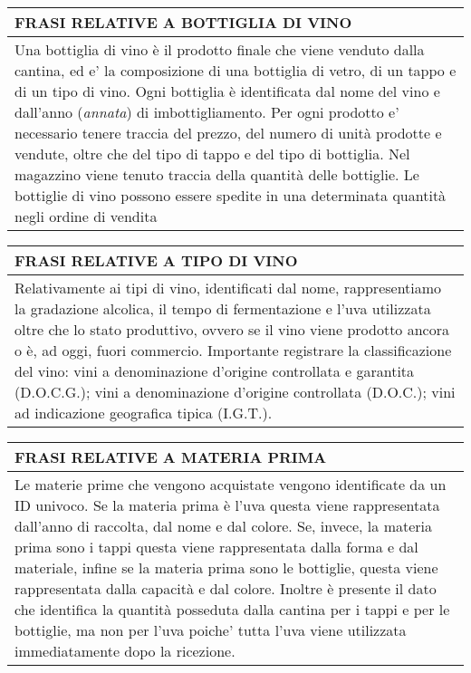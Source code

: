 \begin{center}
	\begin{tabular}{P{16cm}}
		\toprule
		 \textbf {\large {FRASI RELATIVE A BOTTIGLIA DI VINO}} \\
		\midrule
		Una bottiglia di vino è il prodotto finale che viene venduto dalla cantina, ed e' la composizione di una bottiglia di vetro, di un tappo e di un tipo di vino. Ogni bottiglia è identificata dal nome del vino e dall'anno (\emph{annata}) di imbottigliamento. Per ogni prodotto e' necessario tenere traccia del prezzo, del numero di unità prodotte e vendute, oltre che del tipo di tappo e del tipo di bottiglia. Nel magazzino viene tenuto traccia della quantità delle bottiglie. Le bottiglie di vino possono essere spedite in una determinata quantità negli ordine di vendita\\
		\bottomrule
	\end{tabular}

	\vspace{0.5cm}
	
	\begin{tabular}{P{16cm}}
		\toprule
		 \textbf {\large {FRASI RELATIVE A TIPO DI VINO}} \\
		\midrule
		Relativamente ai tipi di vino, identificati dal nome, rappresentiamo la gradazione alcolica, il tempo di fermentazione e l'uva utilizzata oltre che lo stato produttivo, ovvero se il vino viene prodotto ancora o è, ad oggi, fuori commercio. Importante registrare la classificazione del vino: vini a denominazione d'origine controllata e garantita (D.O.C.G.); vini a denominazione d'origine controllata (D.O.C.); vini ad indicazione geografica tipica (I.G.T.). \\
		\bottomrule
	\end{tabular}

	\vspace{0.5cm}
	
	\begin{tabular}{P{16cm}}
		\toprule
		 \textbf {\large {FRASI RELATIVE A MATERIA PRIMA}} \\
		\midrule
		Le materie prime che vengono acquistate vengono identificate da un ID univoco. Se la materia prima è l'uva questa viene rappresentata dall'anno di raccolta, dal nome e dal colore. Se, invece, la materia prima sono i tappi questa viene rappresentata dalla forma e dal materiale, infine se la materia prima sono le bottiglie, questa viene rappresentata dalla capacità e dal colore. Inoltre è presente il dato che identifica la quantità posseduta dalla cantina per i tappi e per le bottiglie, ma non per l'uva poiche' tutta l'uva viene utilizzata immediatamente dopo la ricezione.\\
		\bottomrule
	\end{tabular}


\end{center}
